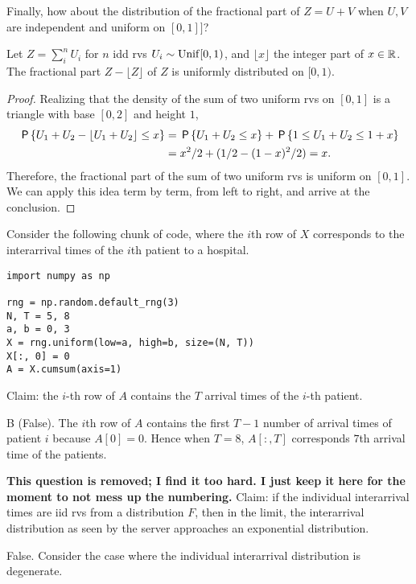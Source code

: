 \documentclass[stochastic-or.tex]{subfiles}
\begin{document}
Finally, how about the distribution of the fractional part of $Z=U+V$ when $U, V$ are independent and uniform on $[0,1]]$?

\begin{theorem}
Let $Z=\sum_{i}^{n} U_{i}$ for $n$ idd rvs $U_{i}\sim \Unif{[0,1)}$, and $\lfloor x \rfloor$  the integer part of $x\in \R$.
The fractional part $Z-\lfloor Z \rfloor$ of $Z$ is uniformly distributed on $[0,1)$.
\end{theorem}
\begin{proof}
Realizing that the density of the sum of two uniform rvs on $[0,1]$ is a triangle with base $[0,2]$ and height $1$,
\begin{align*}
\P{U_{1} +U_{2}- \lfloor U_{1}+U_{2} \rfloor \leq x} &= \P{U_{1} +U_{2}\leq x} + \P{1\leq U_{1} + U_{2}\leq 1 + x} \\
  &= x^{2}/2 +  (1/2 - (1-x)^{2} /2) = x.
\end{align*}
Therefore, the fractional part of the sum of two uniform rvs is uniform on $[0,1]$.
We can apply this idea term by term, from left to right, and arrive at the conclusion.
\end{proof}

\begin{truefalse}
    Consider the following chunk of code, where the $i$th row of $X$ corresponds to the interarrival times of the $i$th patient to a hospital.
\begin{verbatim}
import numpy as np

rng = np.random.default_rng(3)
N, T = 5, 8
a, b = 0, 3
X = rng.uniform(low=a, high=b, size=(N, T))
X[:, 0] = 0
A = X.cumsum(axis=1)
\end{verbatim}
Claim: the $i$-th row of $A$ contains the $T$ arrival times of the $i$-th patient.
\begin{solution}
    B (False).
The $i$th row of $A$ contains the first $T-1$ number of arrival times of patient $i$ because $A[0] = 0$.
Hence when $T=8$, $A[:,T]$ corresponds $7$th arrival time of the patients.
\end{solution}
\end{truefalse}

\begin{truefalse} \textbf{This question is removed; I find it too hard. I just keep it here for the moment to not mess up the numbering.}
Claim: if the individual interarrival times are iid rvs from a distribution $F$, then in the limit, the interarrival distribution as seen by the server approaches an exponential distribution.
\begin{solution}
        False. Consider the case where the individual interarrival distribution is degenerate.
\end{solution}
\end{truefalse}
\end{document}

